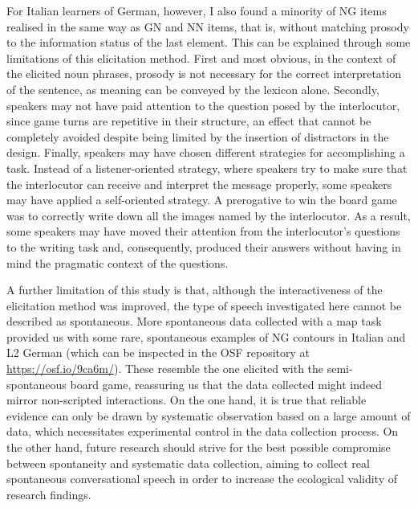 For Italian learners of German, however, I also found a minority of NG items realised in the same way as GN and NN items, that is, without matching prosody to the information status of the last element. This can be explained through some limitations of this elicitation method. First and most obvious, in the context of the elicited noun phrases, prosody is not necessary for the correct interpretation of the sentence, as meaning can be conveyed by the lexicon alone. Secondly, speakers may not have paid attention to the question posed by the interlocutor, since game turns are repetitive in their structure, an effect that cannot be completely avoided despite being limited by the insertion of distractors in the design. Finally, speakers may have chosen different strategies for accomplishing a task. Instead of a listener-oriented strategy, where speakers try to make sure that the interlocutor can receive and interpret the message properly, some speakers may have applied a self-oriented strategy. A prerogative to win the board game was to correctly write down all the images named by the interlocutor. As a result, some speakers may have moved their attention from the interlocutor’s questions to the writing task and, consequently, produced their answers without having in mind the pragmatic context of the questions.

A further limitation of this study is that, although the interactiveness of the elicitation method was improved, the type of speech investigated here cannot be described as spontaneous. More spontaneous data collected with a map task \citep{AndersonEtAl1991} provided us with some rare, spontaneous examples of NG contours in Italian and L2 German (which can be inspected in the OSF repository at \url{https://osf.io/9ca6m/}). These resemble the one elicited with the semi-spontaneous board game, reassuring us that the data collected might indeed mirror non-scripted interactions. On the one hand, it is true that reliable evidence can only be drawn by systematic observation based on a large amount of data, which necessitates experimental control in the data collection process. On the other hand, future research should strive for the best possible compromise between spontaneity and systematic data collection, aiming to collect real spontaneous conversational speech in order to increase the ecological validity of research findings.

